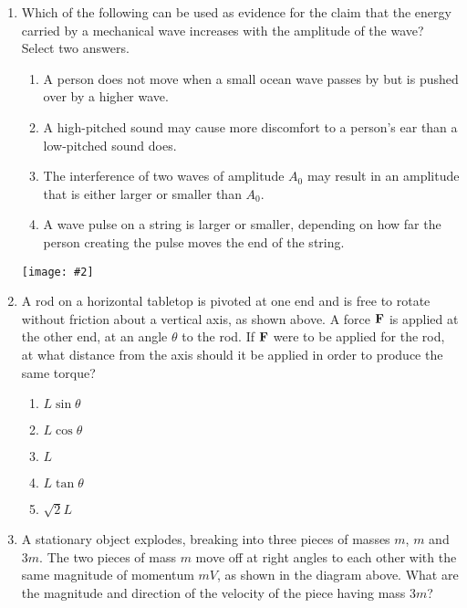 \documentclass[11pt]{article}
\newcommand{\pic}[2]{\texttt{[image: \#2]}}
\newcommand{\mb}[1]{\ensuremath\mathbf{#1}}
\begin{document}
\begin{multicols}{2}
\begin{enumerate}[leftmargin=18pt,resume]
  \item Which of the following can be used as evidence for the claim that the
    energy carried by a mechanical wave increases with the amplitude of the
    wave? Select two answers.
    \begin{enumerate}[nosep,leftmargin=18pt,label=(\Alph*)]
    \item A person does not move when a small ocean wave passes by but is pushed
      over by a higher wave.
    \item A high-pitched sound may cause more discomfort to a person's ear than
      a low-pitched sound does.
    \item The interference of two waves of amplitude $A_0$ may result in an
      amplitude that is either larger or smaller than $A_0$.
    \item A wave pulse on a string is larger or smaller, depending on how far
      the person creating the pulse moves the end of the string.
    \end{enumerate}
    \vspace{.7in}
    \columnbreak
    
    \begin{center}
      \pic{.35}{rod}
    \end{center}
  \item A rod on a horizontal tabletop is pivoted at one end and is free to
    rotate without friction about a vertical axis, as shown above. A force
    $\mb{F}$ is applied at the other end, at an angle $\theta$ to the rod. If
    $\mb{F}$ were to be applied for the rod, at what distance from the axis
    should it be applied in order to produce the same torque?
    \begin{enumerate}[nosep,leftmargin=18pt,label=(\Alph*)]
    \item$L\sin\theta$
    \item$L\cos\theta$
    \item$L$
    \item$L\tan\theta$
    \item$\sqrt{2}L$
    \end{enumerate}
    
    \begin{center}
    \end{center}
  \item A stationary object explodes, breaking into three pieces of masses $m$,
    $m$ and $3m$. The two pieces of mass $m$ move off at right angles to each
    other with the same magnitude of momentum $mV$, as shown in the diagram
    above. What are the magnitude and direction of the velocity of the piece
    having mass $3m$?


\end{enumerate}
\end{multicols}
\end{document}
